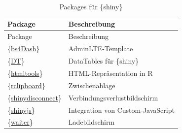 \documentclass[
]{article}
\begin{document}
\begin{longtable}[]{@{}ll@{}}
\caption{\label{tab:pkg-shiny} Packages für \{shiny\}}\tabularnewline
\toprule
Package & Beschreibung \\
\midrule
\endfirsthead
\toprule
Package & Beschreibung \\
\midrule
\endhead
\{\href{https://cran.r-project.org/web/packages/bs4Dash/index.html}{bs4Dash}\} \autocite{R-bs4Dash} & AdminLTE-Template \\
\{\href{https://cran.r-project.org/web/packages/DT/index.html}{DT}\} \autocite{R-DT} & DataTables für \{shiny\} \\
\{\href{https://cran.r-project.org/web/packages/htmltools/index.html}{htmltools}\} \autocite{R-htmltools} & HTML-Repräsentation in R \\
\{\href{https://cran.r-project.org/web/packages/rclipboard/index.html}{rclipboard}\} \autocite{R-rclipboard} & Zwischenablage \\
\{\href{https://cran.r-project.org/web/packages/shinydisconnect/index.html}{shinydisconnect}\} \autocite{R-shinydisconnect} & Verbindungsverlustbildschirm \\
\{\href{https://cran.r-project.org/web/packages/shinyjs/index.html}{shinyjs}\} \autocite{R-shinyjs} & Integration von Custom-JavaScript \\
\{\href{https://cran.r-project.org/web/packages/waiter/index.html}{waiter}\} \autocite{R-waiter} & Ladebildschirm \\
\bottomrule
\end{longtable}
\end{document}

